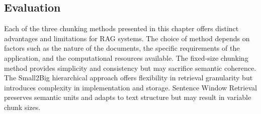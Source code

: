 \subsection{Evaluation}\label{subsec:evaluation}
Each of the three chunking methods presented in this chapter offers distinct advantages and limitations for RAG systems. 
The choice of method depends on factors such as the nature of the documents, the specific requirements of the application, and the computational resources available.
The fixed-size chunking method provides simplicity and consistency but may sacrifice semantic coherence. 
The Small2Big hierarchical approach offers flexibility in retrieval granularity but introduces complexity in implementation and storage. 
Sentence Window Retrieval preserves semantic units and adapts to text structure but may result in variable chunk sizes.
\begin{table}[h!]
    \noindent
    \caption{Evaluation Results for Different Embeddings Models through the Pipeline (just with the Gemma2 model)}
    \label{tab:table_chunking}
\end{table}
